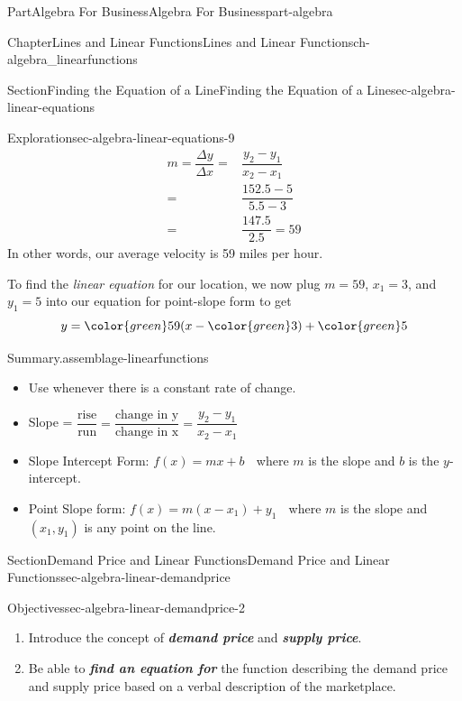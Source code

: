\documentclass{tufte-book}
\newcommand{\alert}[1]{\textbf{\textit{#1}}}
\numberwithin{equation}{chapter}
\newcommand{\amp}{&}
\begin{document}
\begin{partptx}{Part}{Algebra For Business}{}{Algebra For Business}{}{}{part-algebra}
\begin{chapterptx}{Chapter}{Lines and Linear Functions}{}{Lines and Linear Functions}{}{}{ch-algebra_linearfunctions}
\begin{sectionptx}{Section}{Finding the Equation of a Line}{}{Finding the Equation of a Line}{}{}{sec-algebra-linear-equations}
\begin{exploration}{Exploration}{}{sec-algebra-linear-equations-9}
\begin{align*}
m = \dfrac{\Delta y}{\Delta x} = \amp \dfrac{y_2-y_1}{x_2-x_1}\\
= \amp \dfrac{152.5-5}{5.5-3}\\
=  \amp \dfrac {147.5}{2.5} = 59 
\end{align*}
In other words, our average velocity is 59 miles per hour.%
\par
To find the \emph{linear equation} for our location, we now plug \(m=59\), \(x_1 = 3\), and \(y_1 = 5\) into our equation for point-slope form to get%
\begin{equation*}
y = {\color{green} 59} (x - { \color{green} 3}) + {\color{green} 5}
\end{equation*}
%
\end{exploration}%
\begin{assemblage}{Summary}{.}{assemblage-linearfunctions}%
%
\begin{itemize}[label=\textbullet]
\item{}Use whenever there is a constant rate of change.%
\item{}Slope = \(\dfrac{\text{rise}}{\text{run}} = \dfrac{\text{change in y}}{\text{change in x}} = \dfrac{y_2-y_1}{x_2-x_1}\)%
\item{}Slope Intercept Form: \(f(x) = mx + b\) \(\phantom{.}\) where \(m\) is the slope and \(b\) is the \(y\)-intercept.%
\item{}Point Slope form: \(f(x) = m(x-x_1) + y_1\) \(\phantom{.}\) where \(m\) is the slope and \((x_1,y_1)\) is any point on the line.%
\end{itemize}
%
\end{assemblage}
\end{sectionptx}
%
%
\typeout{************************************************}
\typeout{************************************************}
%
\begin{sectionptx}{Section}{Demand Price and Linear Functions}{}{Demand Price and Linear Functions}{}{}{sec-algebra-linear-demandprice}
\begin{objectives}{Objectives}{sec-algebra-linear-demandprice-2}
%
\begin{enumerate}
\item{}Introduce the concept of \alert{demand price} and \alert{supply price}.%
\item{}Be able to \alert{find an equation for} the function describing the demand price and supply price based on a verbal description of the marketplace.%

\end{enumerate}
\end{objectives}
\end{sectionptx}
\end{chapterptx}
\end{partptx}
\end{document}
